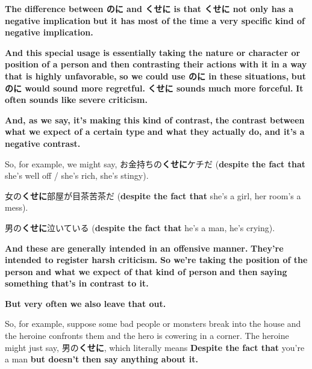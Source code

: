 \startsectionlevel[title={The difference between のに and くせに},reference={the-difference-between-のに-and-くせに}]

{\bf The difference between のに and くせに is that\crlf
くせに not only has a negative implication} {\bf but it has most of the time a very specific kind of negative implication.}

{}

{\bf And this special usage is essentially} {\bf taking the nature or character or position of a person} {\bf and then contrasting their actions with it in a way} {\bf that is highly unfavorable,} {\bf so we could use のに in these situations,} {\bf but のに would sound more regretful.} {\bf くせに sounds much more forceful.} {\bf It often sounds like severe criticism.}

{}

{\bf And, as we say, it's making this kind of contrast,} {\bf the contrast between what we expect of a certain type} {\bf and what they actually do, and it's a negative contrast.}

\thinrule

So, for example, we might say, お金持ちの{\bf くせに}ケチだ ({\bf despite the fact that} she's well off / she's rich, she's stingy).

{}

女の{\bf くせに}部屋が目茶苦茶だ ({\bf despite the fact that} she's a girl, her room's a mess).

男の{\bf くせに}泣いている ({\bf despite the fact that} he's a man, he's crying).

{\bf And these are generally intended in an offensive manner.} {\bf They're intended to register harsh criticism.} {\bf So we're taking the position of the person} {\bf and what we expect of that kind of person} {\bf and then saying something that's in contrast to it.}

{}

{\bf But very often we also leave that out.}

So, for example, suppose some bad people or monsters break into the house and the heroine confronts them and the hero is cowering in a corner. The heroine might just say, 男の{\bf くせに}, which literally means {\bf Despite the fact that} you're a man {\bf but doesn't then say anything about it.}

{}

